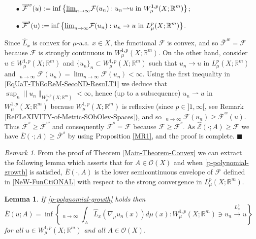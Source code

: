 \documentclass[10pt]{amsart}
\numberwithin{equation}{section}
\newtheorem{lemma}[theorem]{Lemma}
\theoremstyle{definition}
\theoremstyle{remark}
\newtheorem{remark}[theorem]{Remark}
\begin{document}
\begin{itemize}
\item[$\bullet$] $\displaystyle\overline{\mathcal{F}}^w(u):=\inf\left\{{\mathop{\underline{\lim}}}_{n\to\infty}\mathcal{F}(u_n):u_n{\rightharpoonup} u\hbox{ in }W^{1,p}_\mu(X;{{\mathbb R}}^m)\right\}$;
\item[$\bullet$] $\displaystyle\overline{\mathcal{F}}^s(u):=\inf\left\{{\mathop{\underline{\lim}}}_{n\to\infty}\mathcal{F}(u_n):u_n\to u\hbox{ in }L^p_\mu(X;{{\mathbb R}}^m)\right\}$.
\end{itemize}
Since $\widehat{L}_x$ is convex for $\mu$-a.a. $x\in X$, the functional $\mathcal{F}$ is convex, and so $\overline{\mathcal{F}}^w=\mathcal{F}$ because $\mathcal{F}$ is strongly continuous in $W^{1,p}_\mu(X;{{\mathbb R}}^m)$. On the other hand, consider $u\in W^{1,p}_\mu(X;{{\mathbb R}}^m)$ and $\{u_n\}_n\subset W^{1,p}_\mu(X;{{\mathbb R}}^m)$ such that $u_n\to u$ in $L^p_\mu(X;{{\mathbb R}}^m)$ and ${\mathop{\underline{\lim}}}_{n\to\infty}\mathcal{F}(u_n)=\lim_{n\to\infty}\mathcal{F}(u_n)<\infty$. Using the first inequality in \eqref{EqUaT-ThEoReM-SecoND-ResuLT1} we deduce that $\sup_n\|u_n\|_{W^{1,p}_\mu(X;{{\mathbb R}}^m)}<\infty$, hence (up to a subsequence) $u_n{\rightharpoonup} u$ in $W^{1,p}_\mu(X;{{\mathbb R}}^m)$ because $W^{1,p}_\mu(X;{{\mathbb R}}^m)$ is reflexive (since $p\in]1,\infty[$, see Remark \ref{ReFLeXIVITY-of-Metric-SObOlev-Spaces}), and so ${\mathop{\underline{\lim}}}_{n\to\infty}\mathcal{F}(u_n)\geq\overline{\mathcal{F}}^w(u)$. Thus $\overline{\mathcal{F}}^s\geq\overline{\mathcal{F}}^w$ and consequently $\overline{\mathcal{F}}^s=\mathcal{F}$ because $\mathcal{F}\geq \overline{\mathcal{F}}^s$. As $\widehat{\mathcal{E}}(\cdot;A)\geq\mathcal{F}$ we have $\overline{E}(\cdot;A)\geq\overline{\mathcal{F}}^s$ by using Proposition \ref{MR1}, and the proof is complete. $\blacksquare$

\begin{remark}
From the proof of Theorem \ref{Main-Theorem-Convex} we can extract the following lemma which asserts that for $A\in\mathcal{O}(X)$ and when \eqref{p-polynomial-growth} is satisfied, $\overline{E}(\cdot,A)$ is the lower semicontinuous envelope of $\mathcal{F}$ defined in \eqref{NeW-FunCtiONAL} with respect to the strong convergence in $L^p_\mu(X;{{\mathbb R}}^m)$.
\begin{lemma}\label{LeMMa-Main-Convex-Theorem}
If \eqref{p-polynomial-growth} holds then 
\begin{equation}\label{NeW-FoRmUlA}
\overline{E}(u;A)=\inf\left\{{\mathop{\underline{\lim}}}_{n\to\infty}\int_A\widehat{L}_x(\nabla_\mu u_n(x))d\mu(x):W^{1,p}_\mu(X;{{\mathbb R}}^m)\ni u_n\stackrel{L^p_\mu}{\to} u\right\}
\end{equation}
for all $u\in W^{1,p}_\mu(X;{{\mathbb R}}^m)$ and all $A\in\mathcal{O}(X)$.
\end{lemma}
\end{remark}
\end{document}
